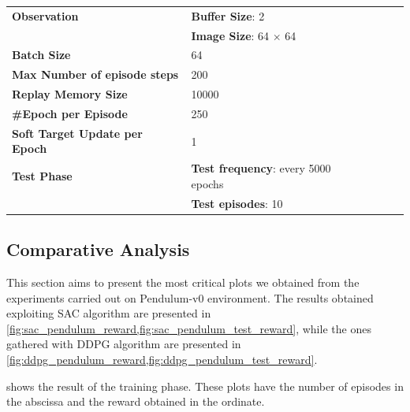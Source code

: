 \begin{table}[!h]
{\begin{tabular}{@{}lllll@{}}
            \textbf{Observation}                  & \textbf{Buffer Size}: 2                                \\
                                                  & \textbf{Image Size}: 64 $\times$ 64                    \\\midrule
            \textbf{Batch Size}                   & 64                                                     \\\midrule
            \textbf{Max Number of episode steps}  & 200                                                    \\\midrule
            \textbf{Replay Memory Size}           & 10000                                                  \\\midrule

            \textbf{\#Epoch per Episode}          & 250                                                    \\\midrule
            \textbf{Soft Target Update per Epoch} & 1                                                      \\\midrule
            \textbf{Test Phase}                   & \textbf{Test frequency}: every 5000 epochs             \\
                                                  & \textbf{Test episodes}: 10                             \\
            \bottomrule
        \end{tabular}}
\end{table}

\FloatBarrier

\subsection{Comparative Analysis}

This section aims to present the most critical plots we obtained from the experiments carried out on Pendulum-v0 environment.
The results obtained exploiting SAC algorithm are presented in \vref{fig:sac_pendulum_reward,fig:sac_pendulum_test_reward}, while the ones gathered with DDPG algorithm are presented in \vref{fig:ddpg_pendulum_reward,fig:ddpg_pendulum_test_reward}.

 shows the result of the training phase.
These plots have the number of episodes in the abscissa and the reward obtained in the ordinate.

